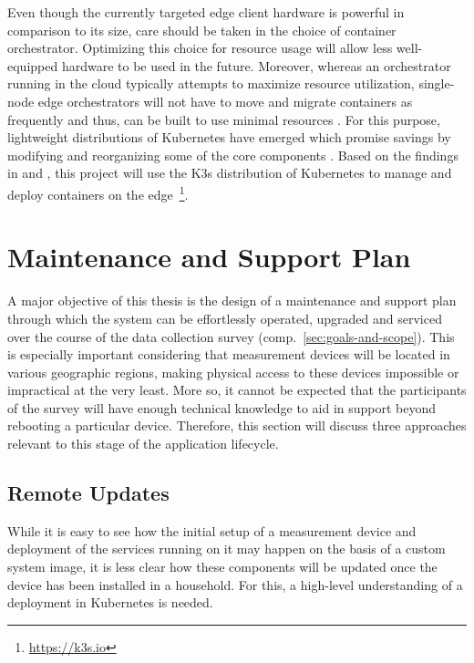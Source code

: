 Even though the currently targeted edge client hardware is powerful in comparison to its size, care should be taken in the choice of container orchestrator. Optimizing this choice for resource usage will allow less well-equipped hardware to be used in the future. Moreover, whereas an orchestrator running in the cloud typically attempts to maximize resource utilization, single-node edge orchestrators will not have to move and migrate containers as frequently and thus, can be built to use minimal resources \cite[p.~2]{goethals2019fledge}. For this purpose, lightweight distributions of Kubernetes have emerged which promise savings by modifying and reorganizing some of the core components \cite[pp.~65--66]{bohm2021profiling}. Based on the findings in \cite{bohm2021profiling} and \cite{goethals2019fledge}, this project will use the K3s distribution of Kubernetes to manage and deploy containers on the edge~\footnote{\url{https://k3s.io}}.


\section{Maintenance and Support Plan}
\label{sec:maintenance-and-support-plan}

A major objective of this thesis is the design of a maintenance and support plan through which the system can be effortlessly operated, upgraded and serviced over the course of the data collection survey (comp.~\autoref{sec:goals-and-scope}). This is especially important considering that measurement devices will be located in various geographic regions, making physical access to these devices impossible or impractical at the very least. More so, it cannot be expected that the participants of the survey will have enough technical knowledge to aid in support beyond rebooting a particular device. Therefore, this section will discuss three approaches relevant to this stage of the application lifecycle.


\subsection{Remote Updates}

While it is easy to see how the initial setup of a measurement device and deployment of the services running on it may happen on the basis of a custom system image, it is less clear how these components will be updated once the device has been installed in a household. For this, a high-level understanding of a deployment in Kubernetes is needed.

